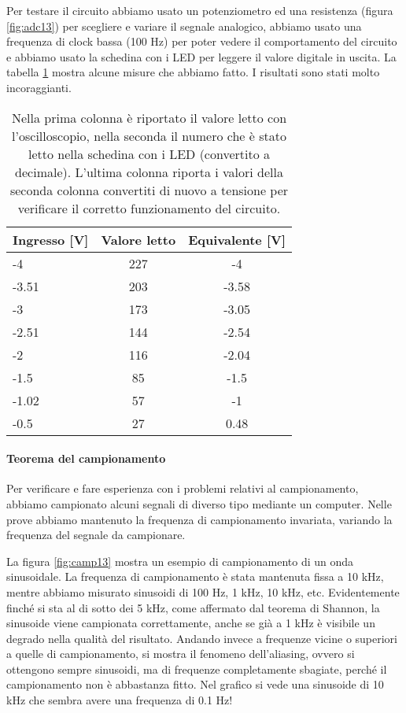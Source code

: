 Per testare il circuito abbiamo usato un potenziometro ed una resistenza (figura \ref{fig:adc13}) per scegliere
e variare il segnale analogico, abbiamo usato una frequenza di clock bassa (100 Hz) per poter vedere il comportamento
del circuito e abbiamo usato la schedina con i LED per leggere il valore digitale in uscita. La tabella \ref{tab:adc13}
mostra alcune misure che abbiamo fatto. I risultati sono stati molto incoraggianti.

\begin{table}
    \begin{tabular}{l c c}
        \toprule
        Ingresso [V] & Valore letto & Equivalente [V] \\
        \midrule
        -4    & 227 & -4 \\
        -3.51 & 203 & -3.58 \\
        -3    & 173 & -3.05 \\
        -2.51 & 144 & -2.54 \\
        -2    & 116 & -2.04 \\
        -1.5  & 85  & -1.5 \\
        -1.02 & 57  & -1 \\
        -0.5  & 27  & 0.48 \\
        \bottomrule
    \end{tabular}
    \caption{Nella prima colonna è riportato il valore letto con l'oscilloscopio,
        nella seconda il numero che è stato letto nella schedina con i LED (convertito a decimale).
        L'ultima colonna riporta i valori della seconda colonna convertiti di nuovo a tensione per verificare
    il corretto funzionamento del circuito.}
    \label{tab:adc13}
\end{table}

\paragraph{Teorema del campionamento}

Per verificare e fare esperienza con i problemi relativi al campionamento, abbiamo campionato
alcuni segnali di diverso tipo mediante un computer. Nelle prove abbiamo mantenuto la frequenza
di campionamento invariata, variando la frequenza del segnale da campionare.

La figura \ref{fig:camp13} mostra un esempio di campionamento di un onda sinusoidale. La frequenza di
campionamento è stata mantenuta fissa a 10 kHz, mentre abbiamo misurato sinusoidi di 100 Hz, 1 kHz, 10 kHz, etc.
Evidentemente finché si sta al di sotto dei 5 kHz, come affermato dal teorema di Shannon, la sinusoide viene
campionata correttamente, anche se già a 1 kHz è visibile un degrado nella qualità del risultato. Andando invece a
frequenze vicine o superiori a quelle di campionamento, si mostra il fenomeno dell'aliasing, ovvero si ottengono
sempre sinusoidi, ma di frequenze completamente sbagiate, perché il campionamento non è abbastanza fitto.
Nel grafico si vede una sinusoide di 10 kHz che sembra avere una frequenza di 0.1 Hz!
